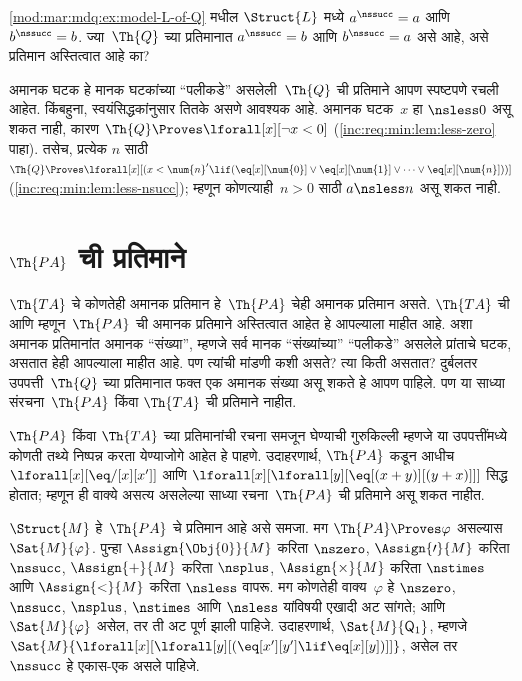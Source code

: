 \begin{prob}
\ref{mod:mar:mdq:ex:model-L-of-Q} मधील $\Struct{L}$ मध्ये $a^\nssucc
= a$ आणि $b^\nssucc = b$. ज्या~$\Th{Q}$ च्या प्रतिमानात
$a^\nssucc = b$ आणि $b^\nssucc = a$ असे आहे, असे प्रतिमान अस्तित्वात आहे का?
\end{prob}

\begin{explain}
अमानक घटक हे मानक घटकांच्या ``पलीकडे'' असलेली~$\Th{Q}$ ची
प्रतिमाने आपण स्पष्टपणे रचली आहेत. किंबहुना, स्वयंसिद्धकांनुसार तितके असणे
आवश्यक आहे. अमानक घटक~$x$ हा ${} \nsless 0$ असू शकत नाही, कारण
$\Th{Q} \Proves \lforall[x][\lnot x<0]$
(\ref{inc:req:min:lem:less-zero} पाहा). तसेच, प्रत्येक $n$ साठी
$\Th{Q} \Proves \lforall[x][(x < \num{n}' \lif
(\eq[x][\num{0}] \lor \eq[x][\num{1}] \lor \dots \lor
\eq[x][\num{n}]))]$ (\ref{inc:req:min:lem:less-nsucc}); म्हणून
कोणत्याही~$n>0$ साठी $a \nsless n$ असू शकत नाही.
\end{explain}











\section{$\Th{PA}$ ची प्रतिमाने}\label{mod:mar:mpa:sec}

\begin{explain}
$\Th{TA}$ चे कोणतेही अमानक प्रतिमान हे~$\Th{PA}$ चेही अमानक प्रतिमान
असते. $\Th{TA}$ ची आणि म्हणून~$\Th{PA}$ ची अमानक प्रतिमाने अस्तित्वात
आहेत हे आपल्याला माहीत आहे. अशा अमानक प्रतिमानांत अमानक ``संख्या'', म्हणजे
सर्व मानक ``संख्यांच्या'' ``पलीकडे'' असलेले प्रांताचे घटक, असतात
हेही आपल्याला माहीत आहे. पण त्यांची मांडणी कशी असते? त्या किती असतात?
दुर्बलतर उपपत्ती~$\Th{Q}$ च्या प्रतिमानात फक्त एक अमानक संख्या असू शकते
हे आपण पाहिले. पण या साध्या संरचना~$\Th{PA}$ किंवा $\Th{TA}$ ची
प्रतिमाने नाहीत.

$\Th{PA}$ किंवा $\Th{TA}$ च्या प्रतिमानांची रचना समजून घेण्याची गुरुकिल्ली
म्हणजे या उपपत्तींमध्ये कोणती तथ्ये निष्पन्न करता येण्याजोगे आहेत हे पाहणे. उदाहरणार्थ,
$\Th{PA}$ कडून आधीच $\lforall[x][\eq/[x][x']]$ आणि
$\lforall[x][\lforall[y][\eq[(x+y)][(y+x)]]]$ सिद्ध होतात; म्हणून ही
वाक्ये असत्य असलेल्या साध्या रचना~$\Th{PA}$ ची प्रतिमाने असू शकत
नाहीत.

$\Struct{M}$ हे~$\Th{PA}$ चे प्रतिमान आहे असे समजा. मग
$\Th{PA} \Proves \varphi$ असल्यास $\Sat{M}{\varphi}$. पुन्हा
$\Assign{\Obj{0}}{M}$ करिता $\nszero$, $\Assign{\prime}{M}$ करिता
$\nssucc$, $\Assign{+}{M}$ करिता $\nsplus$,
$\Assign{\times}{M}$ करिता $\nstimes$ आणि $\Assign{<}{M}$ करिता
$\nsless$ वापरू. मग कोणतेही वाक्य~$\varphi$ हे $\nszero$, $\nssucc$,
$\nsplus$, $\nstimes$ आणि $\nsless$ यांविषयी एखादी अट सांगते; आणि
$\Sat{M}{\varphi}$ असेल, तर ती अट पूर्ण झाली पाहिजे. उदाहरणार्थ,
$\Sat{M}{\mathsf{Q}_1}$, म्हणजे
$\Sat{M}{\lforall[x][\lforall[y][(\eq[x'][y'] \lif \eq[x][y])]]}$,
असेल तर $\nssucc$ हे एकास-एक असले पाहिजे.
\end{explain}

